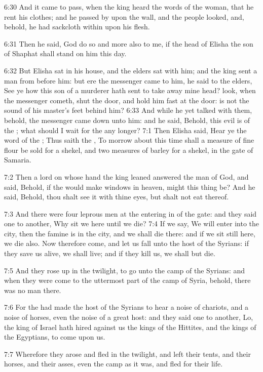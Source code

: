 6:30 And it came to pass, when the king heard the words of the woman,
that he rent his clothes; and he passed by upon the wall, and the
people looked, and, behold, he had sackcloth within upon his flesh.

6:31 Then he said, God do so and more also to me, if the head of
Elisha the son of Shaphat shall stand on him this day.

6:32 But Elisha sat in his house, and the elders sat with him; and the
king sent a man from before him: but ere the messenger came to him, he
said to the elders, See ye how this son of a murderer hath sent to
take away mine head? look, when the messenger cometh, shut the door,
and hold him fast at the door: is not the sound of his master's feet
behind him?  6:33 And while he yet talked with them, behold, the
messenger came down unto him: and he said, Behold, this evil is of the
\LORD; what should I wait for the \LORD any longer?  7:1 Then Elisha
said, Hear ye the word of the \LORD; Thus saith the \LORD, To morrow
about this time shall a measure of fine flour be sold for a shekel,
and two measures of barley for a shekel, in the gate of Samaria.

7:2 Then a lord on whose hand the king leaned answered the man of God,
and said, Behold, if the \LORD would make windows in heaven, might this
thing be?  And he said, Behold, thou shalt see it with thine eyes, but
shalt not eat thereof.

7:3 And there were four leprous men at the entering in of the gate:
and they said one to another, Why sit we here until we die?  7:4 If we
say, We will enter into the city, then the famine is in the city, and
we shall die there: and if we sit still here, we die also. Now
therefore come, and let us fall unto the host of the Syrians: if they
save us alive, we shall live; and if they kill us, we shall but die.

7:5 And they rose up in the twilight, to go unto the camp of the
Syrians: and when they were come to the uttermost part of the camp of
Syria, behold, there was no man there.

7:6 For the \LORD had made the host of the Syrians to hear a noise of
chariots, and a noise of horses, even the noise of a great host: and
they said one to another, Lo, the king of Israel hath hired against us
the kings of the Hittites, and the kings of the Egyptians, to come
upon us.

7:7 Wherefore they arose and fled in the twilight, and left their
tents, and their horses, and their asses, even the camp as it was, and
fled for their life.

